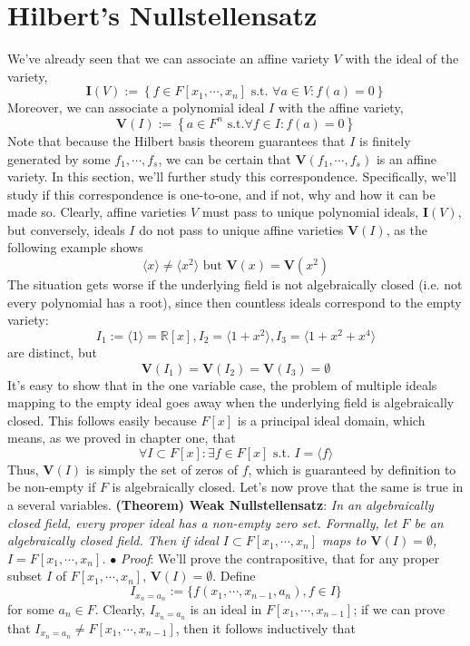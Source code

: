 \documentclass{article}
\newcommand*{\tb}{\textbf}
\newcommand*{\ti}{\textit}
\newcommand*{\n}{\newline}
\newcommand*{\nn}{\newline \newline}
\newcommand*{\Fx}{\ensuremath{F[x_1, \cdots, x_n]}}
\newcommand*{\fs}{f_1, \cdots, f_s}
\newcommand*{\V}{\ensuremath{\mathbf{V}}}
\newcommand*{\I}{\ensuremath{\mathbf{I}}}
\begin{document}
\section{Hilbert's Nullstellensatz}
We've already seen that we can associate an affine variety $ V $ with the ideal of the variety,
$$ \I(V) := \left \{ f \in \Fx \text{ s.t. } \forall a \in V: f(a) = 0 \right \} $$
Moreover, we can associate a polynomial ideal $ I $ with the affine variety,
$$ \V(I) := \left \{ a \in F^n \text{ s.t.} \forall f \in I: f(a) = 0 \right \} $$
Note that because the Hilbert basis theorem guarantees that $ I $ is finitely generated by some $ \fs $, we can be certain that $ \V(\fs) $ is an affine variety. In this section, we'll further study this correspondence. Specifically, we'll study if this correspondence is one-to-one, and if not, why and how it can be made so.
\n
Clearly, affine varieties $ V $ must pass to unique polynomial ideals, $ \I(V) $, but conversely, ideals $ I $ do not pass to unique affine varieties $ \V(I) $, as the following example shows
$$ \langle x \rangle \neq \langle x^2 \rangle \text{ but } \V(x) = \V(x^2) $$
The situation gets worse if the underlying field is not algebraically closed (i.e. not every polynomial has a root), since then countless ideals correspond to the empty variety:
$$ I_1 := \langle 1 \rangle = \mathbb{R}[x], I_2 = \langle 1 + x^2 \rangle, I_3 = \langle 1 + x^2 + x^4 \rangle $$
are distinct, but
$$ \V(I_1) = \V(I_2) = \V(I_3) = \emptyset $$
It's easy to show that in the one variable case, the problem of multiple ideals mapping to the empty ideal goes away when the underlying field is algebraically closed. This follows easily because $ F[x] $ is a principal ideal domain, which means, as we proved in chapter one, that
$$\forall I \subset F[x]: \exists f \in F[x] \text{ s.t. } I = \langle f \rangle $$
Thus, $ \V(I) $ is simply the set of zeros of $ f $, which is guaranteed by definition to be non-empty if $ F $ is algebraically closed. Let's now prove that the same is true in a several variables.
\nn
\tb{(Theorem) Weak Nullstellensatz}: \ti{In an algebraically closed field, every proper ideal has a non-empty zero set. Formally, let $ F $ be an algebraically closed field. Then if ideal $ I \subset \Fx $ maps to $ \V(I) = \emptyset $, $ I = \Fx $.}
\n
\indent $ \bullet $ \ti{Proof}: We'll prove the contrapositive, that for any proper subset $ I $ of $ \Fx $, $ \V(I) = \emptyset $. Define
$$ I_{x_n = a_n} := \{ f(x_1, \cdots, x_{n - 1}, a_n), f \in I \} $$
for some $ a_n \in F $. Clearly, $ I_{x_n = a_n} $ is an ideal in $ F[x_1, \cdots, x_{n - 1}] $; if we can prove that $ I_{x_n = a_n} \neq F[x_1, \cdots, x_{n - 1}] $, then it follows inductively that
\end{document}
